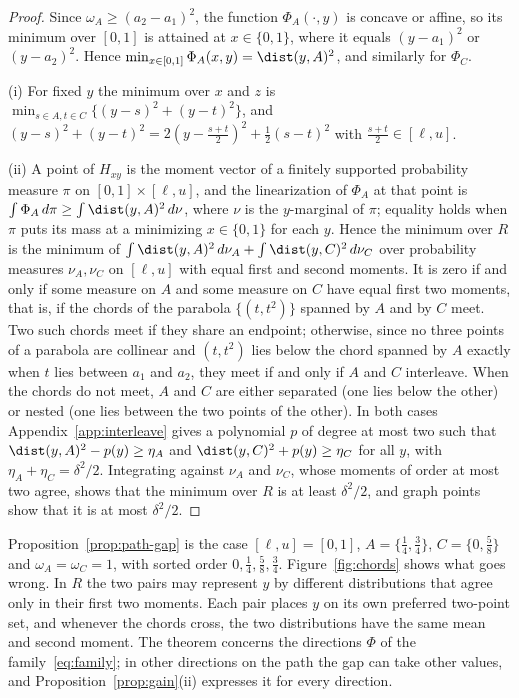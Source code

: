 \begin{proof}
Since $\omega_A\ge(a_2-a_1)^2$, the function $\Phi_A(\cdot,y)$ is concave or
affine, so its minimum over $[0,1]$ is attained at $x\in\{0,1\}$, where it
equals $(y-a_1)^2$ or $(y-a_2)^2$. Hence
$\min_{x\in[0,1]}\Phi_A(x,y)=\dist(y,A)^2$, and similarly for $\Phi_C$.

(i) For fixed $y$ the minimum over $x$ and $z$ is
$\min_{s\in A,t\in C}\{(y-s)^2+(y-t)^2\}$, and
$(y-s)^2+(y-t)^2=2(y-\tfrac{s+t}2)^2+\tfrac12(s-t)^2$ with
$\tfrac{s+t}2\in[\ell,u]$.

(ii) A point of $H_{xy}$ is the moment vector of a finitely supported
probability measure $\pi$ on $[0,1]\times[\ell,u]$, and the linearization of
$\Phi_A$ at that point is $\int\Phi_A\,d\pi\ge\int\dist(y,A)^2\,d\nu$, where
$\nu$ is the $y$-marginal of $\pi$; equality holds when $\pi$ puts its mass
at a minimizing $x\in\{0,1\}$ for each $y$. Hence the minimum over $R$ is
the minimum of $\int\dist(y,A)^2\,d\nu_A+\int\dist(y,C)^2\,d\nu_C$ over
probability measures $\nu_A,\nu_C$ on $[\ell,u]$ with equal first and second
moments. It is zero if and only if some measure on $A$ and some measure on
$C$ have equal first two moments, that is, if the chords of the parabola
$\{(t,t^2)\}$ spanned by $A$ and by $C$ meet. Two such chords meet if they
share an endpoint; otherwise, since no three points of a parabola are
collinear and $(t,t^2)$ lies below the chord spanned by $A$ exactly when $t$
lies between $a_1$ and $a_2$, they meet if and only if $A$ and $C$
interleave. When the chords do not meet, $A$ and $C$ are either separated
(one lies below the other) or nested (one lies between the two points of the
other). In both cases Appendix~\ref{app:interleave} gives a polynomial $p$
of degree at most two such that $\dist(y,A)^2-p(y)\ge\eta_A$ and
$\dist(y,C)^2+p(y)\ge\eta_C$ for all $y$, with $\eta_A+\eta_C=\delta^2/2$.
Integrating against $\nu_A$ and $\nu_C$, whose moments of order at most two
agree, shows that the minimum over $R$ is at least $\delta^2/2$, and graph
points show that it is at most $\delta^2/2$.
\end{proof}



Proposition~\ref{prop:path-gap} is the case $[\ell,u]=[0,1]$,
$A=\{\tfrac14,\tfrac34\}$, $C=\{0,\tfrac58\}$ and $\omega_A=\omega_C=1$, with
sorted order $0,\tfrac14,\tfrac58,\tfrac34$. Figure~\ref{fig:chords} shows
what goes wrong. In $R$ the two pairs may represent $y$ by different
distributions that agree only in their first two moments. Each pair places
$y$ on its own preferred two-point set, and whenever the chords cross, the
two distributions have the same mean and second moment. The theorem
concerns the directions $\Phi$ of the family~\eqref{eq:family}; in other
directions on the path the gap can take other values, and
Proposition~\ref{prop:gain}(ii) expresses it for every direction.

